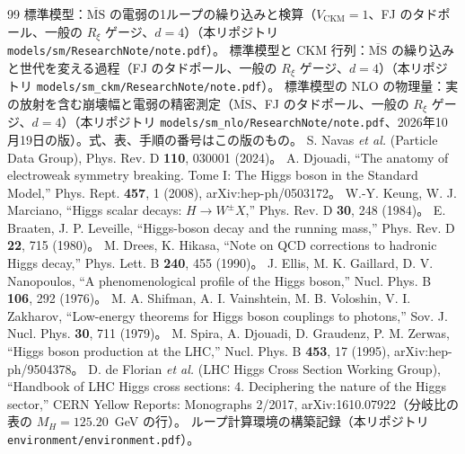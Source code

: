 \documentclass[a4paper,10pt]{ltjsarticle}
\newcommand{\MSbar}{\overline{\mathrm{MS}}}
\begin{document}
\begin{thebibliography}{99}
 標準模型：$\MSbar$ の電弱の1ループの繰り込みと検算（$V_{\mathrm{CKM}}=1$、FJ のタドポール、一般の $R_\xi$ ゲージ、$d=4$）（本リポジトリ \nolinkurl{models/sm/ResearchNote/note.pdf}）。
 標準模型と CKM 行列：$\MSbar$ の繰り込みと世代を変える過程（FJ のタドポール、一般の $R_\xi$ ゲージ、$d=4$）（本リポジトリ \nolinkurl{models/sm_ckm/ResearchNote/note.pdf}）。
 標準模型の NLO の物理量：実の放射を含む崩壊幅と電弱の精密測定（$\MSbar$、FJ のタドポール、一般の $R_\xi$ ゲージ、$d=4$）（本リポジトリ \nolinkurl{models/sm_nlo/ResearchNote/note.pdf}、2026年10月19日の版）。式、表、手順の番号はこの版のもの。
 S. Navas \textit{et al.} (Particle Data Group), Phys. Rev. D \textbf{110}, 030001 (2024)。
 A. Djouadi, ``The anatomy of electroweak symmetry breaking. Tome I: The Higgs boson in the Standard Model,'' Phys. Rept. \textbf{457}, 1 (2008), arXiv:hep-ph/0503172。
 W.-Y. Keung, W. J. Marciano, ``Higgs scalar decays: $H\to W^\pm X$,'' Phys. Rev. D \textbf{30}, 248 (1984)。
 E. Braaten, J. P. Leveille, ``Higgs-boson decay and the running mass,'' Phys. Rev. D \textbf{22}, 715 (1980)。
 M. Drees, K. Hikasa, ``Note on QCD corrections to hadronic Higgs decay,'' Phys. Lett. B \textbf{240}, 455 (1990)。
 J. Ellis, M. K. Gaillard, D. V. Nanopoulos, ``A phenomenological profile of the Higgs boson,'' Nucl. Phys. B \textbf{106}, 292 (1976)。
 M. A. Shifman, A. I. Vainshtein, M. B. Voloshin, V. I. Zakharov, ``Low-energy theorems for Higgs boson couplings to photons,'' Sov. J. Nucl. Phys. \textbf{30}, 711 (1979)。
 M. Spira, A. Djouadi, D. Graudenz, P. M. Zerwas, ``Higgs boson production at the LHC,'' Nucl. Phys. B \textbf{453}, 17 (1995), arXiv:hep-ph/9504378。
 D. de Florian \textit{et al.} (LHC Higgs Cross Section Working Group), ``Handbook of LHC Higgs cross sections: 4. Deciphering the nature of the Higgs sector,'' CERN Yellow Reports: Monographs 2/2017, arXiv:1610.07922（分岐比の表の $M_H=125.20$~GeV の行）。
 ループ計算環境の構築記録（本リポジトリ \nolinkurl{environment/environment.pdf}）。
\end{thebibliography}
\end{document}
